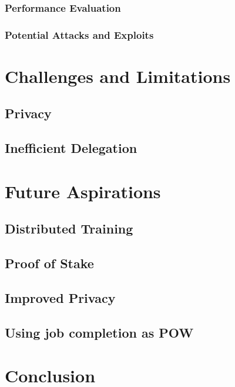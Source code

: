 \documentclass{article}
\begin{document}
\subsubsection{Performance Evaluation}
\subsubsection{Potential Attacks and Exploits}

\section{Challenges and Limitations}
\subsection{Privacy}
\subsection{Inefficient Delegation}

\section {Future Aspirations}
\subsection{Distributed Training}
\subsection{Proof of Stake}
\subsection{Improved Privacy}    
\subsection{Using job completion as POW}

\section {Conclusion}
\end{document}
